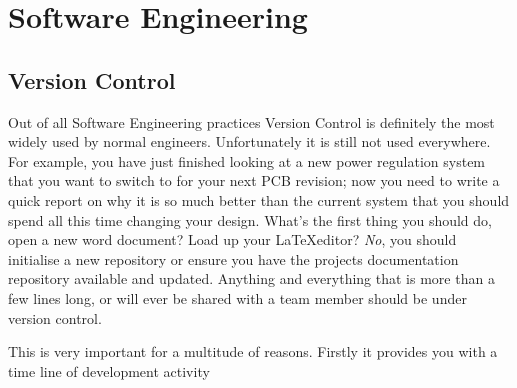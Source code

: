 \section{Software Engineering}

  \subsection{Version Control}

    Out of all Software Engineering practices Version Control is definitely the
    most widely used by normal engineers.  Unfortunately it is still not used
    everywhere.  For example, you have just finished looking at a new power
    regulation system that you want to switch to for your next PCB revision; now
    you need to write a quick report on why it is so much better than the
    current system that you should spend all this time changing your design.
    What's the first thing you should do, open a new word document?  Load up
    your \LaTeX editor?  \emph{No}, you should initialise a new repository or ensure
    you have the projects documentation repository available and updated.
    Anything and everything that is more than a few lines long, or will ever be
    shared with a team member should be under version control.

    This is very important for a multitude of reasons.  Firstly it provides you
    with a time line of development activity
